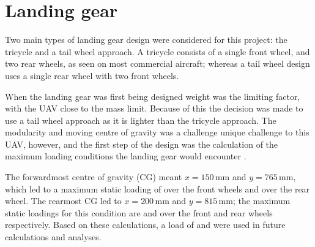 \documentclass[../../main.tex]{subfiles}
\begin{document}
\section{Landing gear} \label{sec:final-design-proposal:landing-gear}


Two main types of landing gear design were considered for this project: the tricycle and a tail wheel approach.
A tricycle consists of a single front wheel, and two rear wheels, as seen on most commercial aircraft; whereas a tail wheel design uses a single rear wheel with two front wheels.


When the landing gear was first being designed weight was the limiting factor, with the UAV close to the  mass limit.
Because of this the decision was made to use a tail wheel approach as it is lighter than the tricycle approach.
The modularity and moving centre of gravity was a challenge unique challenge to this UAV, however, and the first step of the design was the calculation of the maximum loading conditions the landing gear would encounter \cite{goud-14}. 


The forwardmost centre of gravity (CG) meant $x=150\,\mathrm{mm}$ and $y=765\,\mathrm{mm}$, which led to a maximum static loading of  over the front wheels and  over the rear wheel.
The rearmost CG led to $x=200\,\mathrm{mm}$ and $y=815\,\mathrm{mm}$; the maximum static loadings for this condition are  and  over the front and rear wheels respectively.
Based on these calculations, a load of  and  were used in future calculations and analyses. 
\end{document}
